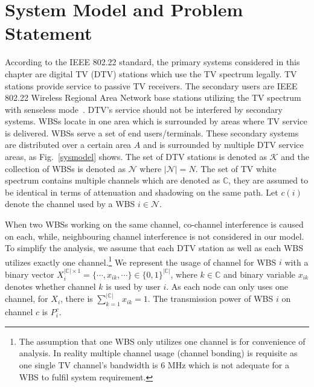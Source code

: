 \documentclass[times]{ettauth}
\theoremstyle{mytheoremstyle}
\theoremstyle{mytheoremstyle}
\theoremstyle{mytheoremstyle}
\begin{document}
\section{System Model and Problem Statement}
\label{SystemModel}
According to the IEEE 802.22 standard, the primary systems considered in this chapter are digital TV (DTV) stations which use the TV spectrum legally. 
TV stations provide service to passive TV receivers.
The secondary users are IEEE 802.22 Wireless Regional Area Network base stations utilizing the TV spectrum with senseless mode~\cite{SenseLess2011}. 
DTV's service should not be interfered by secondary systems. 
WBSs locate in one area which is surrounded by areas where TV service is delivered.
WBSs serve a set of end users/terminals.
These secondary systems are distributed over a certain area $A$ and is surrounded by multiple DTV service areas, as Fig.~\ref{sysmodel} shows. 
The set of DTV stations is denoted as $\mathcal{K}$ and the collection of WBSs is denoted as $\mathcal{N}$ where $|\mathcal{N}|=N$. 
The set of TV white spectrum contains multiple channels which are denoted as $\mathbb{C}$, they are assumed to be identical in terms of attenuation and shadowing on the same path.
Let $c(i)$ denote the channel used by a WBS $i\in \mathcal{N}$.

When two WBSs working on the same channel, co-channel interference is caused on each, while, neighbouring channel interference is not considered in our model. 
To simplify the analysis, we assume that each DTV station as well as each WBS utilizes exactly one channel.\footnote{The assumption that one WBS only utilizes one channel is for convenience of analysis. In reality multiple channel usage (channel bonding) is requisite as one single TV channel's bandwidth is 6 MHz which is not adequate for a WBS to fulfil system requirement. 
}
We represent the usage of channel for WBS $i$ with a binary vector $X_i^{|\mathbb{C}|\times 1}=\{\cdots, x_{ik}, \cdots\}\in \{0,1\}^{|\mathbb{C}|}$, where $k\in \mathbb{C}$ and binary variable $x_{ik}$ denotes whether channel $k$ is used by user $i$. 
As each node can only uses one channel, for $X_i$, there is $\sum_{k=1}^{|\mathbb{C}|}x_{ik}=1$. 
The transmission power of WBS $i$ on channel $c$ is $P_i^c$. 
\end{document}
